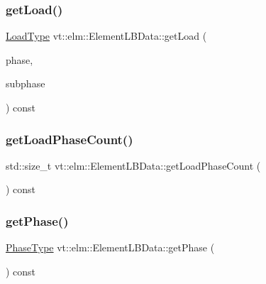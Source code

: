 \mbox{\label{structvt_1_1elm_1_1_element_l_b_data_abbc3c3c8a7c969b0a291f25b8e0d0a62}} 
\subsubsection{\texorpdfstring{get\+Load()}{getLoad()}\hspace{0.1cm}{\footnotesize\ttfamily [2/2]}}
{\footnotesize\ttfamily \hyperlink{namespacevt_a8fb51741340b87d7aaee0bef60e9896b}{Load\+Type} vt\+::elm\+::\+Element\+L\+B\+Data\+::get\+Load (\begin{DoxyParamCaption}\item[{\hyperlink{namespacevt_a46ce6733d5cdbd735d561b7b4029f6d7}{Phase\+Type}}]{phase,  }\item[{\hyperlink{namespacevt_ae78cbfdf1e57470e33eedb074f2beeba}{Subphase\+Type}}]{subphase }\end{DoxyParamCaption}) const}

\mbox{\label{structvt_1_1elm_1_1_element_l_b_data_a2caf9adf8c33a1d2dda021388b84bb00}} 
\subsubsection{\texorpdfstring{get\+Load\+Phase\+Count()}{getLoadPhaseCount()}}
{\footnotesize\ttfamily std\+::size\+\_\+t vt\+::elm\+::\+Element\+L\+B\+Data\+::get\+Load\+Phase\+Count (\begin{DoxyParamCaption}{ }\end{DoxyParamCaption}) const}

\mbox{\label{structvt_1_1elm_1_1_element_l_b_data_ab3e11f3720c9c8ce83b23610eccbef08}} 
\subsubsection{\texorpdfstring{get\+Phase()}{getPhase()}}
{\footnotesize\ttfamily \hyperlink{namespacevt_a46ce6733d5cdbd735d561b7b4029f6d7}{Phase\+Type} vt\+::elm\+::\+Element\+L\+B\+Data\+::get\+Phase (\begin{DoxyParamCaption}{ }\end{DoxyParamCaption}) const}

